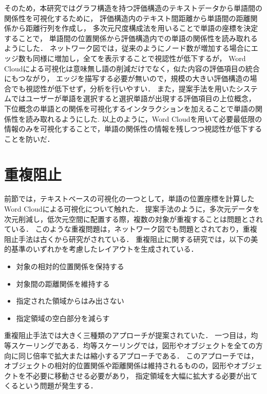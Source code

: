 \documentclass[syuuron]{kuee}
\begin{document}
		そのため，本研究ではグラフ構造を持つ評価構造のテキストデータから単語間の関係性を可視化するために，
		評価構造内のテキスト間距離から単語間の距離関係から距離行列を作成し，
		多次元尺度構成法を用いることで単語の座標を決定することで，
		単語間の位置関係から評価構造内での単語の関係性を読み取れるようにした．
		ネットワーク図では，従来のようにノード数が増加する場合にエッジ数も同様に増加し，全てを表示することで視認性が低下するが，
		Word Cloudによる可視化は意味無し語の削減だけでなく，似た内容の評価項目の統合にもつながり，
		エッジを描写する必要が無いので，規模の大きい評価構造の場合でも視認性が低下せず，分析を行いやすい．
		また，提案手法を用いたシステムではユーザーが単語を選択すると選択単語が出現する評価項目の上位概念，
		下位概念の単語との関係を可視化するインタラクションを加えることで単語の関係性を読み取れるようにした.
		以上のように，Word Cloudを用いて必要最低限の情報のみを可視化することで，単語の関係性の情報を残しつつ視認性が低下することを防いだ．
		
	\section{重複阻止}
		前節では，テキストベースの可視化の一つとして，単語の位置座標を計算したWord Cloudによる可視化について触れた．
		提案手法のように，多次元データを次元削減し，低次元空間に配置する際，複数の対象が重複することは問題とされている．
		このような重複問題は，ネットワーク図でも問題とされており，重複阻止手法は古くから研究がされている．
		重複阻止に関する研究では，以下の美的基準のいずれかを考慮したレイアウトを生成されている\cite{fta2, or2}．
		\begin{itemize}
			\item 対象の相対的位置関係を保持する
			\item 対象間の距離関係を維持する
			\item 指定された領域からはみ出さない
			\item 指定領域の空白部分を減らす
		\end{itemize}
		
		重複阻止手法では大きく三種類のアプローチが提案されていた．
		一つ目は，均等スケーリングである．均等スケーリングでは，図形やオブジェクトを全ての方向に同じ倍率で拡大または縮小するアプローチである\cite{fsa1}．
		このアプローチでは，オブジェクトの相対的位置関係や距離関係は維持されるものの，図形やオブジェクトを不必要に移動させる必要があり，
		指定領域を大幅に拡大する必要が出てくるという問題が発生する．
		
\end{document}
